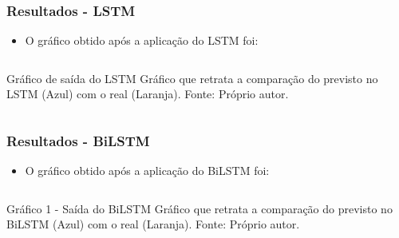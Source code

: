 \documentclass[aspectratio=169]{beamer}
\begin{document}
\begin{frame}[fragile]
	\frametitle{Resultados - LSTM}

	\begin{itemize} 
		\item O gráfico obtido após a aplicação do LSTM foi:
	\end{itemize}

		\begin{columns}[c]
			\begin{column}{1\linewidth}
				\begin{figure}
					\label{fig:lstm}
				\end{figure}

				\begin{block}{Gráfico de saída do LSTM}
					Gráfico que retrata a comparação do previsto no LSTM (Azul) com o real (Laranja). \newline Fonte: Próprio autor.    
				\end{block}
			\end{column}
		\end{columns}
	\end{frame}

\begin{frame}[fragile]
	\frametitle{Resultados - BiLSTM}

	\begin{itemize} 
		\item O gráfico obtido após a aplicação do BiLSTM foi:
	\end{itemize}

		\begin{columns}[c]
			\begin{column}{1\linewidth}
				\begin{figure}
					\label{fig:bilstm}
				\end{figure}

				\begin{block}{Gráfico 1 - Saída do BiLSTM}
					Gráfico que retrata a comparação do previsto no BiLSTM (Azul) com o real (Laranja). \newline Fonte: Próprio autor.    
				\end{block}
			\end{column}
		\end{columns}
	\end{frame}
\end{document}
